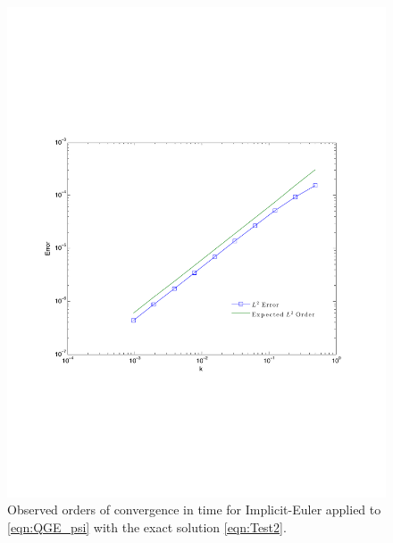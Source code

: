 \begin{figure}
  \begin{center}
    \includegraphics[scale=0.6]{expsinTimeConvergence.pdf}
    \caption{Observed orders of convergence in time for Implicit-Euler applied to
      \eqref{eqn:QGE_psi} with the exact solution \eqref{eqn:Test2}.}
  \label{fig:Test2Time}
  \end{center}
\end{figure}

